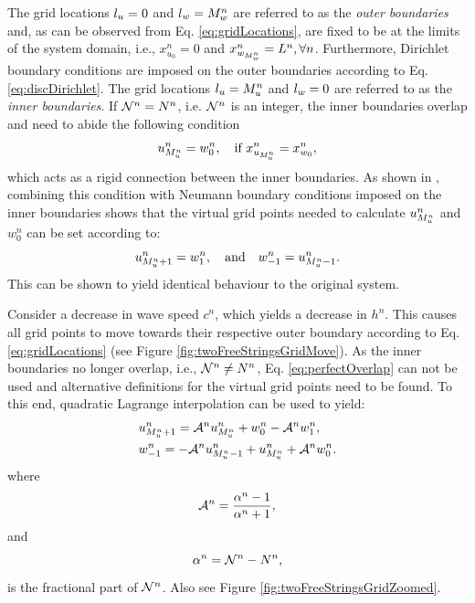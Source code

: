 \documentclass[fleqn]{jaes}
\begin{document}
The grid locations ${l_u} = 0$ and ${l_w} = M_w^n$ are referred to as the \textit{outer boundaries} and, as can be observed from Eq. \eqref{eq:gridLocations}, are fixed to be at the limits of the system domain, i.e., $x_{u_0}^n = 0$ and $x_{w_{M_w^n}}^n = L^n, \forall n$. Furthermore, Dirichlet boundary conditions are imposed on the outer boundaries according to Eq. \eqref{eq:discDirichlet}. 
The grid locations ${l_u} = M_u^n$ and ${l_w} = 0$  are referred to as the \textit{inner boundaries}. If $\mathcal{N}^n = N^n$, i.e. $\mathcal{N}^n$ is an integer, the inner boundaries overlap and need to abide the following condition
\begin{equation}\label{eq:rigid}
    u_{\Mu}^n = w_0^n, \quad \text{if}\  x_{u_{\Mu}}^n =  x_{w_0}^n,
\end{equation}
which acts as a rigid connection between the inner boundaries. As shown in
\cite{Willemsen2021a}, combining this condition with Neumann boundary conditions imposed on the inner boundaries shows that the virtual grid points needed to calculate $u_{M_u^n}^n$ and $w_0^n$ can be set according to:
\begin{equation}\label{eq:perfectOverlap}
    u_{\Mu+1}^n = w_1^n, \qaq w_{-1}^n = u_{\Mu-1}^n.
\end{equation}
This can be shown to yield identical behaviour to the original system.

Consider a decrease in wave speed $c^n$, which yields a decrease in $h^n$. This causes all grid points to move towards their respective outer boundary according to Eq. \eqref{eq:gridLocations} (see Figure \ref{fig:twoFreeStringsGridMove}). As the inner boundaries no longer overlap, i.e., $\mathcal{N}^n \neq N^n$, Eq. \ref{eq:perfectOverlap} can not be used and alternative definitions for the virtual grid points need to be found. To this end, quadratic Lagrange interpolation can be used to yield:
\begin{subequations}\label{eq:connectionInterpol}
    \begin{align}
            &u_{\Mu+1}^n = \Aterm u_{\Mu}^n + w_0^n - \Aterm w_1^n,
        \label{eq:calcUMP1}\\
            &w_{-1}^n = -\Aterm u_{\Mu-1}^n + u_{\Mu}^n+\Aterm w_{0}^n.\label{eq:calcWM1}
    \end{align}
\end{subequations}
where
\begin{equation}
    \mathcal{A}^n = \frac{\alpha^n-1}{\alpha^n+1},
\end{equation}
and 
\begin{equation}\label{eq:alphaDef}
    \alpha^n = \Nfrac^n - N^n,
\end{equation}
is the fractional part of $\mathcal{N}^n$. Also see Figure \ref{fig:twoFreeStringsGridZoomed}.
\end{document}
